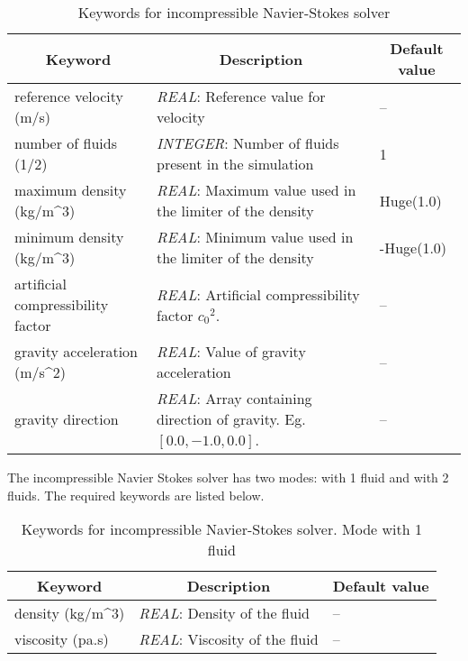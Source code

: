 \documentclass[a4paper,10pt]{report}
\begin{document}
\begin{table}[htbp]
    \caption{Keywords for incompressible Navier-Stokes solver}
    \begin{tabular}{|l|p{10cm}|p{2.2cm}|}
    \hline
    \multicolumn{1}{|c|}{Keyword} & \multicolumn{1}{c|}{Description} & \multicolumn{1}{c|}{Default value} \\ \hline
    reference velocity (m/s)            & \textit{REAL}: Reference value for velocity                                                                                              & -- \\ \hline
    number of fluids (1/2)              & \textit{INTEGER}: Number of fluids present in the simulation                                                                             &  1 \\ \hline
    maximum density (kg/m\^{}3)            & \textit{REAL}: Maximum value used in the limiter of the density                                                                       &  Huge(1.0) \\ \hline
    minimum density (kg/m\^{}3)            & \textit{REAL}: Minimum value used in the limiter of the density                                                                       & -Huge(1.0) \\ \hline
    artificial compressibility factor   & \textit{REAL}: Artificial compressibility factor ${c_0}^2$.                                                                              & -- \\ \hline
    gravity acceleration (m/s\^{}2)        & \textit{REAL}: Value of gravity acceleration                                                                                          & -- \\ \hline
    gravity direction                   & \textit{REAL}: Array containing direction of gravity. Eg. $[0.0,-1.0,0.0]$.                                                              & -- \\ \hline
    \end{tabular}
    \label{tab:INSKey}
    \end{table}

The incompressible Navier Stokes solver has two modes: with 1 fluid and with 2 fluids. The required keywords are listed below.

    \begin{table}[htbp]
        \caption{Keywords for incompressible Navier-Stokes solver. Mode with 1 fluid}
        \begin{tabular}{|l|p{10cm}|p{2.2cm}|}
        \hline
        \multicolumn{1}{|c|}{Keyword} & \multicolumn{1}{c|}{Description} & \multicolumn{1}{c|}{Default value} \\ \hline
        density (kg/m\^{}3)            & \textit{REAL}: Density of the fluid   & -- \\ \hline
        viscosity (pa.s)            & \textit{REAL}: Viscosity of the fluid & -- \\ \hline                                                                        
    \end{tabular}
    \label{tab:INSKey_1fluid}
    \end{table}
    
\end{document}
